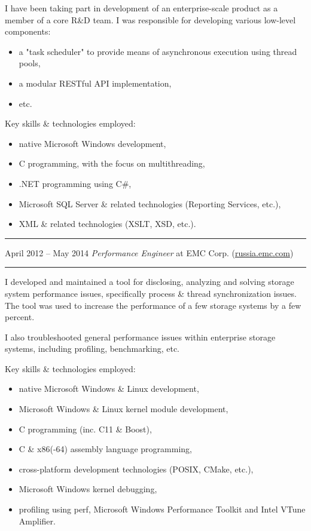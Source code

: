 \documentclass[11pt]{article}
\newcommand\CXX{C\nolinebreak[4]\hspace{-.05em}\raisebox{.4ex}{\relsize{-3}{\textbf{++}}}}
\newcommand\CvSmallSkipLength{0.5em}
\newcommand\CvSkip[1]{\vspace{#1}}
\newcommand\CvSmallSkip{\CvSkip{\CvSmallSkipLength}}
\newcommand\CvRule{\begingroup\color{CvRuleColor}\hrule\endgroup}
\newcommand\CvWorkplaceHeader[5]{\begingroup%
  \CvRule%
  \fboxsep0pt%
  \colorbox{CvWorkplaceHeaderColor}{%
    \begin{minipage}{\linewidth-2\fboxsep}%
\CvSmallSkip%
#1 -- #2 \hfill \textit{#3} at #4 (\href{http://#5/}{#5})%
\CvSmallSkip%
    \end{minipage}%
  }%
  \CvRule%
\endgroup%
}
\newenvironment{CvWorkplaceDescription}{%
    \begingroup\setlength\parskip{\CvSmallSkipLength}%
  }{%
    \CvSmallSkip\endgroup%
  }
\begin{document}
\begin{CvWorkplaceDescription}
I have been taking part in development of an enterprise-scale product as a
member of a core R\&D team.
I was responsible for developing various low-level components:
\begin{itemize}[noitemsep]
  \item a "task scheduler" to provide means of asynchronous execution using
  thread pools,
  \item a modular RESTful API implementation,
  \item etc.
\end{itemize}

Key skills \& technologies employed:
\begin{itemize}[noitemsep]
  \item native Microsoft Windows development,
  \item {\CXX} programming, with the focus on multithreading,
  \item .NET programming using C\#,
  \item Microsoft SQL Server \& related technologies (Reporting Services,
etc.),
  \item XML \& related technologies (XSLT, XSD, etc.).
\end{itemize}
\end{CvWorkplaceDescription}

\CvWorkplaceHeader{April 2012}{May 2014}{Performance Engineer}{EMC Corp.}{russia.emc.com}

\begin{CvWorkplaceDescription}
I developed and maintained a tool for disclosing, analyzing and solving storage
system performance issues, specifically process \& thread synchronization
issues.
The tool was used to increase the performance of a few storage systems by a few
percent.

I also troubleshooted general performance issues within enterprise storage
systems, including profiling, benchmarking, etc.

Key skills \& technologies employed:
\begin{itemize}[noitemsep]
  \item native Microsoft Windows \& Linux development,
  \item Microsoft Windows \& Linux kernel module development,
  \item {\CXX} programming (inc. {\CXX}11 \& Boost),
  \item C \& x86(-64) assembly language programming,
  \item cross-platform development technologies (POSIX, CMake, etc.),
  \item Microsoft Windows kernel debugging,
  \item profiling using perf, Microsoft Windows Performance Toolkit and Intel
VTune Amplifier.
\end{itemize}
\end{CvWorkplaceDescription}
\end{document}
